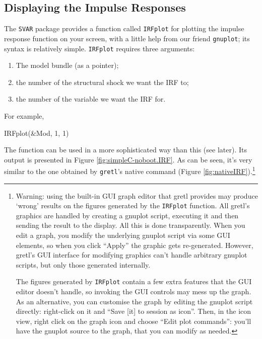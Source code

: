 \documentclass[a4paper,10pt]{article}
\newcommand{\app}[1]{\textsf{#1}}
\newcounter{script}[section]
\begin{document}
\subsection{Displaying the Impulse Responses}
\label{sec:IRF-FEVD}

The \texttt{SVAR} package provides a function called \texttt{IRFplot}
for plotting the impulse response function on your screen, with a
little help from our friend \texttt{gnuplot}; its syntax is relatively
simple. \texttt{IRFplot} requires three arguments:
\begin{enumerate}
\item The model bundle (as a pointer);
\item the number of the structural shock we want the IRF to;
\item the number of the variable we want the IRF for.
\end{enumerate}
For example,
\begin{code}
  IRFplot(&Mod, 1, 1)
\end{code}

The function can be used in a more sophisticated way than this (see
later). Its output is presented in Figure
\ref{fig:simpleC-noboot.IRF}. As can be seen, it's very similar to the
one obtained by \texttt{gretl}'s native command (Figure
\ref{fig:nativeIRF}).\footnote{Warning: using the built-in GUI graph
  editor that gretl provides may produce `wrong' results on the
  figures generated by the \texttt{IRFplot} function.  All
  \app{gretl}'s graphics are handled by creating a gnuplot script,
  executing it and then sending the result to the display. All this is
  done transparently. When you edit a graph, you modify the underlying
  gnuplot script via some GUI elements, so when you click ``Apply''
  the graphic gets re-generated. However, \app{gretl}'s GUI interface
  for modifying graphics can't handle arbitrary gnuplot scripts, but
  only those generated internally.

  The figures generated by \texttt{IRFplot} contain a few extra
  features that the GUI editor doesn't handle, so invoking the GUI
  controls may mess up the graph. As an alternative, you can customise
  the graph by editing the gnuplot script directly: right-click on it
  and ``Save [it] to session as icon''. Then, in the icon view, right
  click on the graph icon and choose ``Edit plot commands'': you'll have
  the gnuplot source to the graph, that you can modify as needed.}
\end{document}
